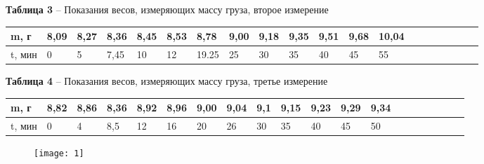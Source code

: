 \documentclass[12pt,a4paper]{article}
\begin{document}
        \begin{table}[!h]
        \begin{flushleft}
       		\hspace{30}\textbf{Таблица 3} -- Показания весов, измеряющих массу груза, второе измерение \\
        \end{flushleft}
            \begin{center}
                \begin{tabular}{| l | l | l | l | l | l | l | l | l | l |l | l | l | l | l | l | l | l | l | l |}
                \hline
                 m, г    &  8,09    &   8,27    &   8,36    &   8,45    &   8,53    &   8,78     &   9,00    &  9,18    &   9,35    &   9,51    &   9,68    &  10,04 \\
                \hline
                t, мин    &  0       &   5       &   7,45    &   10      &   12      &   19.25   &   25      &    30     &   35      &   40      &   45      &  55    \\
                \hline                
                \end{tabular}
            \end{center}
        \end{table}
       
        \begin{table}[!h]
        \begin{flushleft}
       		\hspace{30}\textbf{Таблица 4} -- Показания весов, измеряющих массу груза, третье измерение \\
        \end{flushleft}
            \begin{center}
                \begin{tabular}{| l | l | l | l | l | l | l | l | l | l |l | l | l | l | l | l | l | l | l | l |}
                \hline
                m, г    &  8,82    &   8,86    &   8,36    &   8,92    &   8,96    &   9,00    &   9,04    &   9,1     &   9,15    &   9,23    &   9,29    &  9,34 \\
                \hline
                t, мин    &  0       &   4       &   8,5     &   12      &   16      &   20      &   26      &    30     &   35      &   40      &   45      &  50   \\
               \hline                
               \end{tabular}
            \end{center}
        \end{table}
        \begin{figure}[h!]
        	\begin{center}
        		\texttt{[image: 1]}\\
            	{\scriptsize
            	\begin{center}
            	\hspace{69pt}{Рисунок 2 -- График зависимости массы шарика с грузом от времени в 1 измерении}
            	\end{center}}
        	\end{center}
            \label{scheme1}
        \end{figure}
\end{document}
